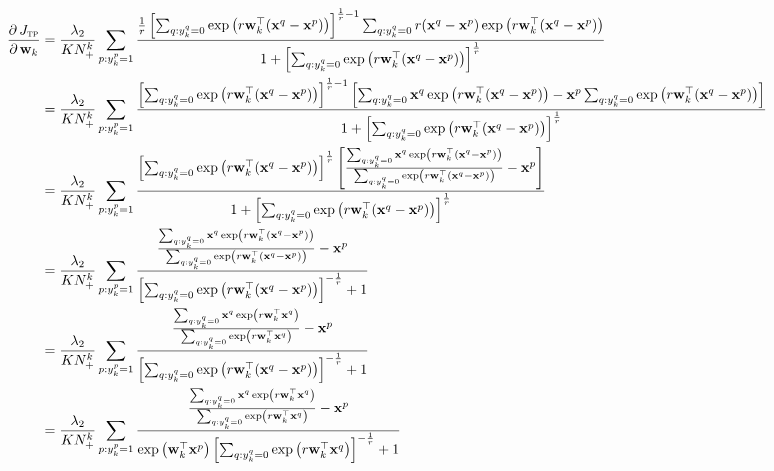 \documentclass[9pt]{extarticle}
\newcommand{\x}{\mathbf{x}}
\newcommand{\1}{\mathbf{1}}
\newcommand{\w}{\mathbf{w}}
\begin{document}
\begin{equation}
\label{eq:grad_of_tp_tp_p2}
\begin{aligned}
\frac{\partial \, J_\textsc{tp}}{\partial \, \w_k} 
&= \frac{\lambda_2}{KN_+^k} \sum_{p:y_k^p=1} 
   \frac{\frac{1}{r} \left[ \sum_{q:y_k^q=0} \exp \left(r \w_k^\top (\x^q - \x^p) \right) \right]^{\frac{1}{r} - 1} 
         \sum_{q:y_k^q=0} r (\x^q - \x^p) \exp \left(r \w_k^\top (\x^q - \x^p) \right) }
        {1 + \left[ \sum_{q:y_k^q=0} \exp \left(r \w_k^\top (\x^q - \x^p) \right) \right]^\frac{1}{r}} \\
&= \frac{\lambda_2}{KN_+^k} \sum_{p:y_k^p=1} 
   \frac{\left[ \sum_{q:y_k^q=0} \exp \left(r \w_k^\top (\x^q - \x^p) \right) \right]^{\frac{1}{r} - 1} \left[
         \sum_{q:y_k^q=0} \x^q \exp \left(r \w_k^\top (\x^q - \x^p) \right) - \x^p \sum_{q:y_k^q=0} \exp \left(r \w_k^\top (\x^q - \x^p) \right) \right]}
        {1 + \left[ \sum_{q:y_k^q=0} \exp \left(r \w_k^\top (\x^q - \x^p) \right) \right]^\frac{1}{r}} \\
&= \frac{\lambda_2}{KN_+^k} \sum_{p:y_k^p=1} 
   \frac{\left[ \sum_{q:y_k^q=0} \exp \left(r \w_k^\top (\x^q - \x^p) \right) \right]^{\frac{1}{r}} \left[
         \frac{\sum_{q:y_k^q=0} \x^q \exp \left(r \w_k^\top (\x^q - \x^p) \right)}
              {\sum_{q:y_k^q=0} \exp \left(r \w_k^\top (\x^q - \x^p) \right)} - \x^p \right] }
        {1 + \left[ \sum_{q:y_k^q=0} \exp \left(r \w_k^\top (\x^q - \x^p) \right) \right]^\frac{1}{r}} \\
&= \frac{\lambda_2}{KN_+^k} \sum_{p:y_k^p=1} 
   \frac{\frac{\sum_{q:y_k^q=0} \x^q \exp \left(r \w_k^\top (\x^q - \x^p) \right)}
              {\sum_{q:y_k^q=0} \exp \left(r \w_k^\top (\x^q - \x^p) \right)} - \x^p }
        {\left[ \sum_{q:y_k^q=0} \exp \left(r \w_k^\top (\x^q - \x^p) \right) \right]^{-\frac{1}{r}} + 1} \\
&= \frac{\lambda_2}{KN_+^k} \sum_{p:y_k^p=1} 
   \frac{\frac{\sum_{q:y_k^q=0} \x^q \exp \left(r \w_k^\top \x^q \right)}
              {\sum_{q:y_k^q=0} \exp \left(r \w_k^\top \x^q \right)} - \x^p }
        {\left[ \sum_{q:y_k^q=0} \exp \left(r \w_k^\top (\x^q - \x^p) \right) \right]^{-\frac{1}{r}} + 1} \\
&= \frac{\lambda_2}{KN_+^k} \sum_{p:y_k^p=1}
   \frac{\frac{\sum_{q:y_k^q=0} \x^q \exp \left(r \w_k^\top \x^q \right)}
              {\sum_{q:y_k^q=0} \exp \left(r \w_k^\top \x^q \right)} - \x^p }
        {\exp \left( \w_k^\top \x^p \right) \left[ \sum_{q:y_k^q=0} \exp \left(r \w_k^\top \x^q \right) \right]^{-\frac{1}{r}} + 1} \\

\end{aligned}
\end{equation}
\end{document}
